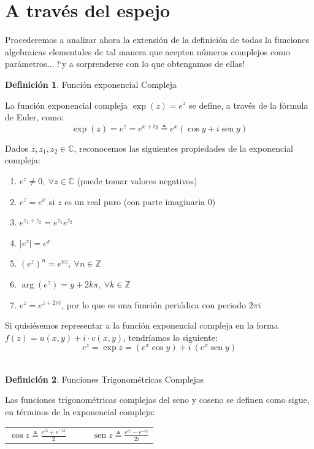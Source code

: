 \documentclass[12pt]{article}
\theoremstyle{definition}
\newtheorem{definition}{Definici\'on}[section]
\theoremstyle{theorem}
\DeclareMathOperator{\sen}{sen}
\begin{document}
\section{A trav\'es del espejo}
Procederemos a analizar ahora la extensi\'on de la definici\'on de todas la funciones algebraicas elementales de tal manera que acepten n\'umeros complejos como par\'ametros... !`y a sorprenderse con lo que obtengamos de ellas!\\

\colorbox{red!40!white!80}{\parbox{\linewidth}{
\theoremstyle{definition}
\begin{definition}{Funci\'on exponencial Compleja}

La funci\'on exponencial compleja $\exp(z) = e^{z}$ se define, a trav\'es de la f\'ormula de Euler, como: $$\exp(z) = e^z = e^{x+iy} \triangleq e^x(\cos y + i\sen y)$$

\end{definition}
}}
\linebreak
\linebreak

Dados $z, z_1, z_2 \in \mathbb{C}$, reconocemos las siguientes propiedades de la exponencial compleja:
\begin{enumerate}
	\item $e^z \neq 0,\ \forall z \in \mathbb{C}$ (puede tomar valores negativos)
	\item $e^z = e^x$ si $z$ es un real puro (con parte imaginaria 0)
	\item $e^{z_1+z_2} = e^{z_1}e^{z_2}$
	\item $|e^z| = e^x$
	\item $(e^z)^n = e^{nz},\ \forall n \in \mathbb{Z}$
	\item $\arg(e^z) = y + 2k\pi,\ \forall k \in \mathbb{Z}$
	\item $e^z = e^{z + 2\pi i}$, por lo que es una funci\'on peri\'odica con periodo $2\pi i$	
\end{enumerate}

Si quisi\'esemos representar a la funci\'on exponencial compleja en la forma $f(z) = u(x, y) + i\cdot v(x, y)$, tendr\'iamos lo siguiente:
$$e^z = \exp z = (e^x \cos y) + i\ (e^x \sen y)$$\\

\colorbox{red!40!white!80}{\parbox{\linewidth}{
\theoremstyle{definition}
\begin{definition}{Funciones Trigonom\'etricas Complejas}

Las funciones trigonom\'etricas complejas del seno y coseno se definen como sigue, en t\'erminos de la exponencial compleja:
\begin{center}
	\begin{tabular}{ccc}
		$\displaystyle \cos z \triangleq \frac{e^{iz} + e^{-iz}}{2} $ &\ \ & $\displaystyle \sen z \triangleq \frac{e^{iz} - e^{-iz}}{2i} $\\
	\end{tabular}
\end{center}
\end{definition}
}}
\linebreak
\linebreak
\end{document}
